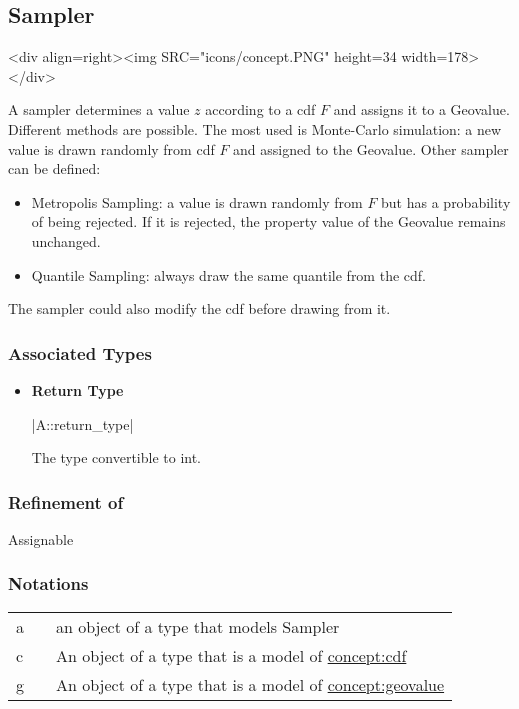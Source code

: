 \documentclass[12pt,twoside]{report}
\begin{document}
% 
\subsection{Sampler}
\label{concept:sampler}
\begin{htmlonly}
<div align=right><img SRC="icons/concept.PNG" height=34 width=178></div>
\end{htmlonly}

A sampler determines a value $z$ according to a cdf $F$ and assigns it to a Geovalue. Different methods are possible. The most used is Monte-Carlo simulation: a new value is drawn randomly from cdf $F$ and assigned to the Geovalue. 
Other sampler can be defined:
\begin{itemize}
\item Metropolis Sampling: a value is drawn randomly from $F$ but has a probability of being rejected. If it is rejected, the property value of the Geovalue remains unchanged.
\item Quantile Sampling: always draw the same quantile from the cdf. 
\end{itemize}
The sampler could also modify the cdf before drawing from it.
 



\htmlrule[CLEAR=all]  \subsubsection*{Associated Types}
\begin{itemize}
\item {\bf Return Type}

  |A::return_type|

  The type convertible to int.
\end{itemize}



\htmlrule[CLEAR=all]  \subsubsection*{Refinement of}
Assignable

 

\htmlrule[CLEAR=all]  \subsubsection*{Notations}

\begin{tabular}[!h]{l l l}
a & & an object of a type that models Sampler\\
c & & An object of a type that is a model of \hyperref{CDF}{CDF}{}{concept:cdf}\\
g & & An object of a type that is a model of \hyperref{Geovalue}{Geovalue}{}{concept:geovalue}\\
\end{tabular}
\end{document}
